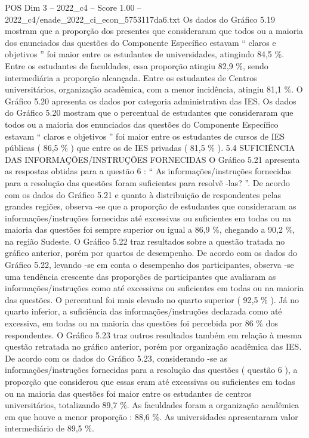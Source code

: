 \begin{textsample}{POS Dim 3 – 2022\_c4 – Score 1.00 – 2022\_c4/enade\_2022\_ci\_econ\_5753117da6.txt}
Os dados do Gráfico 5.19 mostram que a proporção dos presentes que consideraram que todos ou a maioria dos enunciados das questões do Componente Específico estavam “ claros e objetivos ” foi maior entre os estudantes de universidades, atingindo 84,5 \%.
Entre os estudantes de faculdades, essa proporção atingiu 82,9 \%, sendo intermediária a proporção alcançada.
Entre os estudantes de Centros universitários, organização acadêmica, com a menor incidência, atingiu 81,1 \%.
O Gráfico 5.20 apresenta os dados por categoria administrativa das IES.
Os dados do Gráfico 5.20 mostram que o percentual de estudantes que consideraram que todos ou a maioria dos enunciados das questões do Componente Específico estavam “ claros e objetivos ” foi maior entre os estudantes de cursos de IES públicas ( 86,5 \% ) que entre os de IES privadas ( 81,5 \% ). 5.4 SUFICIÊNCIA DAS INFORMAÇÕES/INSTRUÇÕES FORNECIDAS O Gráfico 5.21 apresenta as respostas obtidas para a questão 6 : “ As informações/instruções fornecidas para a resolução das questões foram suficientes para resolvê -las? ”.
De acordo com os dados do Gráfico 5.21 e quanto à distribuição de respondentes pelas grandes regiões, observa -se que a proporção de estudantes que consideraram as informações/instruções fornecidas até excessivas ou suficientes em todas ou na maioria das questões foi sempre superior ou igual a 86,9 \%, chegando a 90,2 \%, na região Sudeste.
O Gráfico 5.22 traz resultados sobre a questão tratada no gráfico anterior, porém por quartos de desempenho.
De acordo com os dados do Gráfico 5.22, levando -se em conta o desempenho dos participantes, observa -se uma tendência crescente das proporções de participantes que avaliaram as informações/instruções como até excessivas ou suficientes em todas ou na maioria das questões.
O percentual foi mais elevado no quarto superior ( 92,5 \% ).
Já no quarto inferior, a suficiência das informações/instruções declarada como até excessiva, em todas ou na maioria das questões foi percebida por 86 \% dos respondentes.
O Gráfico 5.23 traz outros resultados também em relação à mesma questão retratada no gráfico anterior, porém por organização acadêmica das IES.
De acordo com os dados do Gráfico 5.23, considerando -se as informações/instruções fornecidas para a resolução das questões ( questão 6 ), a proporção que considerou que essas eram até excessivas ou suficientes em todas ou na maioria das questões foi maior entre os estudantes de centros universitários, totalizando 89,7 \%.
As faculdades foram a organização acadêmica em que houve a menor proporção : 88,6 \%.
As universidades apresentaram valor intermediário de 89,5 \%.

\end{textsample}
